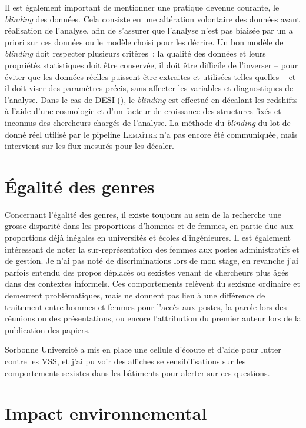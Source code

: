 \documentclass{book}
\def\lemaitre{\textsc{Lemaître}\xspace}
\begin{document}
Il est également important de mentionner une pratique devenue courante, le \textit{blinding} des données. Cela consiste en une altération volontaire des données avant réalisation de l'analyse, afin de s'assurer que l'analyse n'est pas biaisée par un a priori sur ces données ou le modèle choisi pour les décrire. Un bon modèle de \textit{blinding} doit respecter plusieurs critères~: la qualité des données et leurs propriétés statistiques doit être conservée, il doit être difficile de l'inverser -- pour éviter que les données réelles puissent être extraites et utilisées telles quelles -- et il doit viser des paramètres précis, sans affecter les variables et diagnostiques de l'analyse. Dans le cas de DESI (\cite{andrade_validating_2024}), le \textit{blinding} est effectué en décalant les redshifts à l'aide d'une cosmologie et d'un facteur de croissance des structures fixés et inconnus des chercheurs chargés de l'analyse. La méthode du \textit{blinding} du lot de donné réel utilisé par le pipeline \lemaitre n'a pas encore été communiquée, mais intervient sur les flux mesurés pour les décaler.

\section{Égalité des genres}

Concernant l'égalité des genres, il existe toujours au sein de la recherche une grosse disparité dans les proportions d'hommes et de femmes, en partie due aux proportions déjà inégales en universités et écoles d'ingénieures. Il est également intéressant de noter la sur-représentation des femmes aux postes administratifs et de gestion. Je n'ai pas noté de discriminations lors de mon stage, en revanche j'ai parfois entendu des propos déplacés ou sexistes venant de chercheurs plus âgés dans des contextes informels. Ces comportements relèvent du sexisme ordinaire et demeurent problématiques, mais ne donnent pas lieu à une différence de traitement entre hommes et femmes pour l'accès aux postes, la parole lors des réunions ou des présentations, ou encore l'attribution du premier auteur lors de la publication des papiers.

Sorbonne Université a mis en place une cellule d'écoute et d'aide pour lutter contre les VSS, et j'ai pu voir des affiches se sensibilisations sur les comportements sexistes dans les bâtiments pour alerter sur ces questions.

\section{Impact environnemental}
\end{document}
